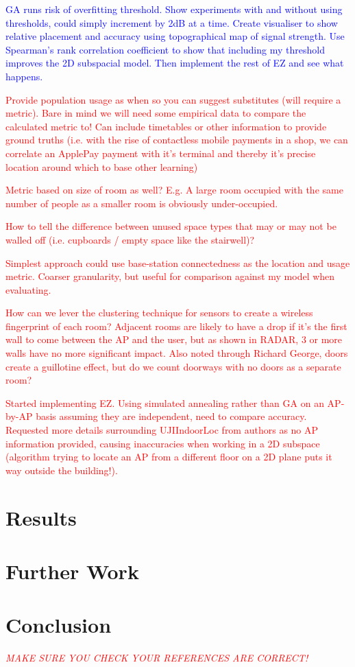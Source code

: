 \documentclass{UoYCSproject}
\begin{document}
        \textcolor{blue}{GA runs risk of overfitting threshold. Show experiments with and without using thresholds, could simply increment by 2dB at a time. Create visualiser to show relative placement and accuracy using topographical map of signal strength. Use Spearman's rank correlation coefficient to show that including my threshold improves the 2D subspacial model. Then implement the rest of EZ and see what happens.}
	
		\textcolor{red}{Provide population usage as when so you can suggest substitutes (will require a metric). Bare in mind we will need some empirical data to compare the calculated metric to! Can include timetables or other information to provide ground truths (i.e. with the rise of contactless mobile payments in a shop, we can correlate an ApplePay payment with it's terminal and thereby it's precise location around which to base other learning)}
        
        \textcolor{red}{Metric based on size of room as well? E.g. A large room occupied with the same number of people as a smaller room is obviously under-occupied.}
         
        \textcolor{red}{How to tell the difference between unused space types that may or may not be walled off (i.e. cupboards / empty space like the stairwell)?}
        
        \textcolor{red}{Simplest approach could use base-station connectedness as the location and usage metric. Coarser granularity, but useful for comparison against my model when evaluating.}
        
        \textcolor{red}{How can we lever the clustering technique for sensors to create a wireless fingerprint of each room? Adjacent rooms are likely to have a drop if it's the first wall to come between the AP and the user, but as shown in RADAR, 3 or more walls have no more significant impact. Also noted through Richard George, doors create a guillotine effect, but do we count doorways with no doors as a separate room?}
        
        \textcolor{red}{Started implementing EZ. Using simulated annealing rather than GA on an AP-by-AP basis assuming they are independent, need to compare accuracy. Requested more details surrounding UJIIndoorLoc from authors as no AP information provided, causing inaccuracies when working in a 2D subspace (algorithm trying to locate an AP from a different floor on a 2D plane puts it way outside the building!).}
	
	\chapter{Results}
	
	\chapter{Further Work}
	
	\chapter{Conclusion}
    
    \textcolor{red}{\emph{MAKE SURE YOU CHECK YOUR REFERENCES ARE CORRECT!}}
        
    
	
\end{document}
